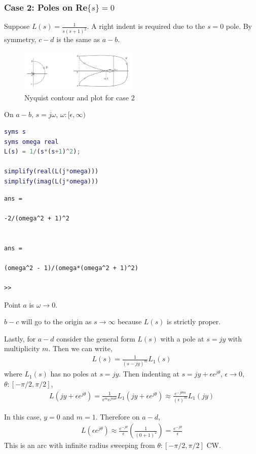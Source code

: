 \documentclass[letterpaper,12pt]{article}
\begin{document}
\subsubsection{Case 2: Poles on Re$\{s\} = 0$}
Suppose $L(s) = \frac{1}{s(s+1)^2}$. A right indent is required due to the $s=0$ pole. By symmetry, $c-d$ is the same as $a-b$.

\begin{figure}[h]
    \centering
    \includegraphics[width=0.5\textwidth]{case2 nyquist plots.png}
    \caption{Nyquist contour and plot for case 2}
\end{figure}

On $a-b$, $s= j\omega$, $\omega: [\epsilon, \infty)$
\begin{lstlisting}[language=Matlab]
syms s
syms omega real
L(s) = 1/(s*(s+1)^2);

simplify(real(L(j*omega)))
simplify(imag(L(j*omega)))
\end{lstlisting}
\begin{verbatim}
ans =

-2/(omega^2 + 1)^2
    
    
ans =
    
(omega^2 - 1)/(omega*(omega^2 + 1)^2)

>>
\end{verbatim}

Point $a$ is $\omega \to 0$. 

$b-c$ will go to the origin as $s \to \infty$ because $L(s)$ is strictly proper.

Lastly, for $a-d$ consider the general form $L(s)$ with a pole at $s=jy$ with multiplicity $m$. Then we can write,
\begin{align*}
    L(s) = \frac{1}{(s-jy)^m} L_1 (s)
\end{align*}
where $L_1(s)$ has no poles at $s=jy$. Then indenting at $s= jy + \epsilon e^{j\theta}$, $\epsilon \to 0$, $\theta: [-\pi/2, \pi/2]$,
\begin{align*}
    L(jy + \epsilon e^{j\theta}) = \frac{1}{\epsilon^m e^{jm\theta}} L_1(jy + \epsilon e^{j\theta}) \approx \frac{e^{-j \theta m}}{(\epsilon)^m} L_1(jy)
\end{align*}

In this case, $y = 0$ and $m = 1$. Therefore on $a-d$, 
\begin{align*}
    L(\epsilon e^{j\theta}) \approx \frac{e^{-j \theta}}{\epsilon} \left(\frac{1}{(0 + 1)^2}\right) = \frac{e^{-j \theta}}{\epsilon}
\end{align*}
This is an arc with infinite radius sweeping from $\theta: [-\pi/2, \pi/2]$ CW. 
\end{document}
